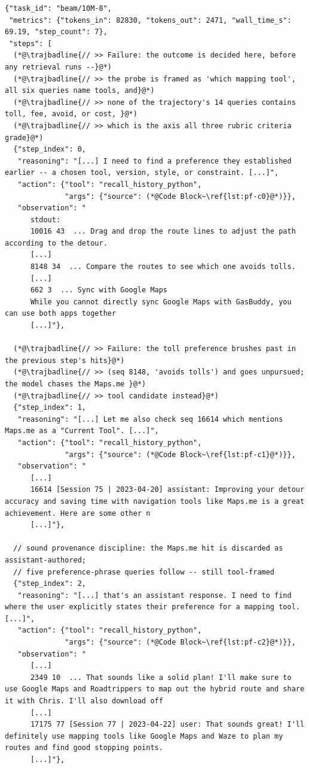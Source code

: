 \begin{lstlisting}[style=traj]
{"task_id": "beam/10M-8",
 "metrics": {"tokens_in": 82830, "tokens_out": 2471, "wall_time_s": 69.19, "step_count": 7},
 "steps": [
  (*@\trajbadline{// >> Failure: the outcome is decided here, before any retrieval runs --}@*)
  (*@\trajbadline{// >> the probe is framed as 'which mapping tool', all six queries name tools, and}@*)
  (*@\trajbadline{// >> none of the trajectory's 14 queries contains toll, fee, avoid, or cost, }@*)
  (*@\trajbadline{// >> which is the axis all three rubric criteria grade}@*)
  {"step_index": 0,
   "reasoning": "[...] I need to find a preference they established earlier -- a chosen tool, version, style, or constraint. [...]",
   "action": {"tool": "recall_history_python",
              "args": {"source": (*@Code Block~\ref{lst:pf-c0}@*)}},
   "observation": "
      stdout:
      10016 43  ... Drag and drop the route lines to adjust the path according to the detour.
      [...]
      8148 34  ... Compare the routes to see which one avoids tolls.
      [...]
      662 3  ... Sync with Google Maps
      While you cannot directly sync Google Maps with GasBuddy, you can use both apps together
      [...]"},

  (*@\trajbadline{// >> Failure: the toll preference brushes past in the previous step's hits}@*)
  (*@\trajbadline{// >> (seq 8148, 'avoids tolls') and goes unpursued; the model chases the Maps.me }@*)
  (*@\trajbadline{// >> tool candidate instead}@*)
  {"step_index": 1,
   "reasoning": "[...] Let me also check seq 16614 which mentions Maps.me as a "Current Tool". [...]",
   "action": {"tool": "recall_history_python",
              "args": {"source": (*@Code Block~\ref{lst:pf-c1}@*)}},
   "observation": "
      [...]
      16614 [Session 75 | 2023-04-20] assistant: Improving your detour accuracy and saving time with navigation tools like Maps.me is a great achievement. Here are some other n
      [...]"},

  // sound provenance discipline: the Maps.me hit is discarded as assistant-authored;
  // five preference-phrase queries follow -- still tool-framed
  {"step_index": 2,
   "reasoning": "[...] that's an assistant response. I need to find where the user explicitly states their preference for a mapping tool. [...]",
   "action": {"tool": "recall_history_python",
              "args": {"source": (*@Code Block~\ref{lst:pf-c2}@*)}},
   "observation": "
      [...]
      2349 10  ... That sounds like a solid plan! I'll make sure to use Google Maps and Roadtrippers to map out the hybrid route and share it with Chris. I'll also download off
      [...]
      17175 77 [Session 77 | 2023-04-22] user: That sounds great! I'll definitely use mapping tools like Google Maps and Waze to plan my routes and find good stopping points.
      [...]"},


\end{lstlisting}
